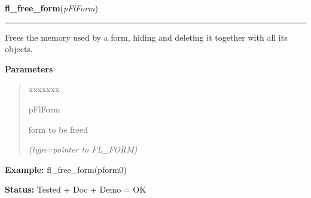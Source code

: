     \label{xformslib:flbasic:fl_free_form}

    \vspace{0.5ex}

\hspace{.8\funcindent}\begin{boxedminipage}{\funcwidth}

    \raggedright \textbf{fl\_free\_form}(\textit{pFlForm})

    \vspace{-1.5ex}

    \rule{\textwidth}{0.5\fboxrule}
\setlength{\parskip}{2ex}
    Frees the memory used by a form, hiding and deleting it together with 
    all its objects.

\setlength{\parskip}{1ex}
      \textbf{Parameters}
      \vspace{-1ex}

      \begin{quote}
        \begin{Ventry}{xxxxxxx}

          \item[pFlForm]

          form to be freed

            {\it (type=pointer to FL\_FORM)}

        \end{Ventry}

      \end{quote}

\textbf{Example:} fl\_free\_form(pform0)



\textbf{Status:} Tested + Doc + Demo = OK



    \end{boxedminipage}

    \label{xformslib:flbasic:fl_redraw_form}

    \vspace{0.5ex}

